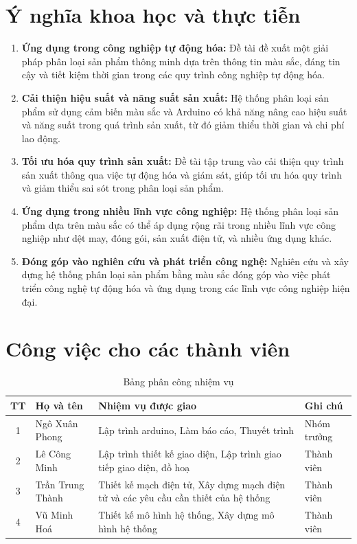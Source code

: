 \documentclass[12pt]{report}
\begin{document}
\section{Ý nghĩa khoa học và thực tiễn}
\begin{enumerate}[itemsep=0pt, parsep=0pt]
    \item \textbf{Ứng dụng trong công nghiệp tự động hóa:} Đề tài đề xuất một giải pháp phân loại sản phẩm thông minh dựa trên thông tin màu sắc, đáng tin cậy và tiết kiệm thời gian trong các quy trình công nghiệp tự động hóa.
    
    \item \textbf{Cải thiện hiệu suất và năng suất sản xuất:} Hệ thống phân loại sản phẩm sử dụng cảm biến màu sắc và Arduino có khả năng nâng cao hiệu suất và năng suất trong quá trình sản xuất, từ đó giảm thiểu thời gian và chi phí lao động.
    
    \item \textbf{Tối ưu hóa quy trình sản xuất:} Đề tài tập trung vào cải thiện quy trình sản xuất thông qua việc tự động hóa và giám sát, giúp tối ưu hóa quy trình và giảm thiểu sai sót trong phân loại sản phẩm.
    
    \item \textbf{Ứng dụng trong nhiều lĩnh vực công nghiệp:} Hệ thống phân loại sản phẩm dựa trên màu sắc có thể áp dụng rộng rãi trong nhiều lĩnh vực công nghiệp như dệt may, đóng gói, sản xuất điện tử, và nhiều ứng dụng khác.
    
    \item \textbf{Đóng góp vào nghiên cứu và phát triển công nghệ:} Nghiên cứu và xây dựng hệ thống phân loại sản phẩm bằng màu sắc đóng góp vào việc phát triển công nghệ tự động hóa và ứng dụng trong các lĩnh vực công nghiệp hiện đại.
\end{enumerate}

\section{Công việc cho các thành viên}
\begin{table}[H]
    \centering
    \begin{tabular}{|c|l|p{6cm}|l|} %
        \hline
        TT & Họ và tên & Nhiệm vụ được giao & Ghi chú \\
        \hline
        1 & Ngô Xuân Phong & Lập trình arduino, Làm báo cáo, Thuyết trình & Nhóm trưởng \\
        \hline
        2 & Lê Công Minh & Lập trình thiết kế giao diện, Lập trình giao tiếp giao diện, đồ hoạ & Thành viên \\
        \hline
        3 & Trần Trung Thành & Thiết kế mạch điện tử, Xây dựng mạch điện tử và các yêu cầu cần thiết của hệ thống & Thành viên\\
        \hline
        4 & Vũ Minh Hoá & Thiết kế mô hình hệ thống, Xây dựng mô hình hệ thống & Thành viên \\
        \hline
    \end{tabular}
    \caption{Bảng phân công nhiệm vụ} %
\end{table}
\end{document}
